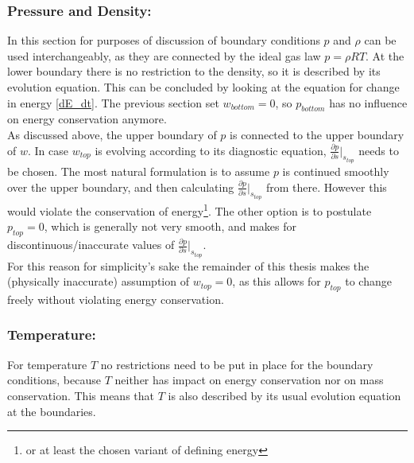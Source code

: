 \subsubsection{Pressure and Density:}
In this section for purposes of discussion of boundary conditions $p$ and $\rho$ can be used interchangeably, as they are connected by the ideal gas law $p=\rho RT$.
At the lower boundary there is no restriction to the density, so it is described by its evolution equation.
This can be concluded by looking at the equation for change in energy \ref{dE_dt}.
The previous section set $w_{bottom}=0$, so $p_{bottom}$ has no influence on energy conservation anymore.\\
As discussed above, the upper boundary of $p$ is connected to the upper boundary of $w$.
In case $w_{top}$ is evolving according to its diagnostic equation, $\frac{\partial p}{\partial s}\rvert _{s_{top}}$ needs to be chosen.
The most natural formulation is to assume $p$ is continued smoothly over the upper boundary, and then calculating $\frac{\partial p}{\partial s}\rvert _{s_{top}}$ from there.
However this would violate the conservation of energy\footnote{or at least the chosen variant of defining energy}.
The other option is to postulate $p_{top}=0$, which is generally not very smooth, and makes for discontinuous/inaccurate values of $\frac{\partial p}{\partial s}\rvert _{s_{top}}$.\\
For this reason for simplicity's sake the remainder of this thesis makes the (physically inaccurate) assumption of $w_{top}=0$, as this allows for $p_{top}$ to change freely without violating energy conservation.
\subsubsection{Temperature:}
For temperature $T$ no restrictions need to be put in place for the boundary conditions, because $T$ neither has impact on energy conservation nor on mass conservation.
This means that $T$ is also described by its usual evolution equation at the boundaries.

